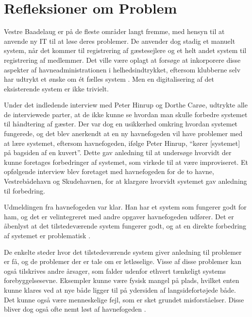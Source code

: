 \chapter{Refleksioner om Problem}
Vestre Baadelaug er på de fleste områder langt fremme, med hensyn til at anvende ny IT til at løse deres problemer. De anvender dog stadig et manuelt system, når det kommer til registrering af gæstesejlere og et helt andet system til registrering af medlemmer. Det ville være oplagt at forsøge at inkorporere disse aspekter af havneadministrationen i helhedsindtrykket, eftersom klubberne selv har udtrykt et ønske om ét fælles system \cite{int_vb_sl}. Men en digitalisering af det eksisterende system er ikke trivielt.

Under det indledende interview med Peter Hinrup og Dorthe Carøe, udtrykte alle de interviewede parter, at de ikke kunne se hvordan man skulle forbedre systemet til håndtering af gæster. Der var dog en usikkerhed omkring hvordan systemet fungerede, og det blev anerkendt at en ny havnefogeden vil have problemer med at lære systemet, eftersom havnefogeden, ifølge Peter Hinrup, \enquote{kører [systemet] på bagsiden af en kuvert}. Dette gav anledning til at undersøge hvorvidt der kunne foretages forbedringer af systemet, som virkede til at være improviseret. Et opfølgende interview blev foretaget med havnefogeden for de to havne, Vestrebådehavn og Skudehavnen, for at klargøre hvorvidt systemet gav anledning til forbedring.

Udmeldingen fra havnefogeden var klar. Han har et system som fungerer godt for ham, og det er velintegreret med andre opgaver havnefogeden udfører. Det er åbenlyst at det tilstedeværende system fungerer godt, og at en direkte forbedring af systemet er problematisk \cite{int_hf}. 


De enkelte steder hvor det tilstedeværende system giver anledning til problemer er få, og de problemer der er tale om er letløselige. Visse af disse problemer kan også tilskrives andre årsager, som falder udenfor ethvert tænkeligt systems forebyggelsesevne. Eksempler kunne være fysisk mangel på plads, hvilket enten kunne klares ved at nye både ligger til på ydersiden af langsidefortøjede både. Det kunne også være menneskelige fejl, som er sket grundet misforståelser. Disse bliver dog også ofte nemt løst af havnefogeden \cite{int_hf}.

